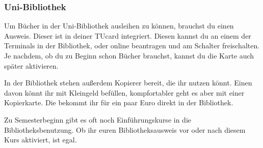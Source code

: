 \begin{multicols}{2}
\subsubsection{Uni-Bibliothek}
	\label{todobib}

	Um Bücher in der Uni-Bibliothek ausleihen zu können, brauchst du einen Ausweis. Dieser ist in deiner TUcard integriert. Diesen kannst du an einem der Terminals in der Bibliothek, oder online beantragen und am Schalter freischalten. Je nachdem, ob du zu Beginn schon Bücher brauchst, kannst du die Karte auch später aktivieren.

	In der Bibliothek stehen außerdem Kopierer bereit, die ihr nutzen könnt. Einen davon könnt ihr mit Kleingeld befüllen, kompfortabler geht es aber mit einer Kopierkarte. Die bekommt ihr für ein paar Euro direkt in der Bibliothek.

	Zu Semesterbeginn gibt es oft noch Einführungskurse in die Bibliotheksbenutzung. Ob ihr euren Bibliotheksausweis vor oder nach diesem Kurs aktiviert, ist egal.
	
\end{multicols}
